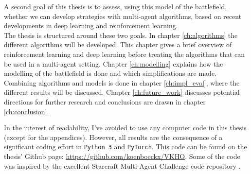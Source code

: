 A second goal of this thesis is to assess, using this model of the battlefield, whether we can develop strategies with multi-agent algorithms, based on recent developments in deep learning and reinforcement learning.\\
The thesis is structured around these two goals. In chapter \ref{ch:algorithms} the different algorithms will be developed. This chapter gives a brief overview of reinforcement learning and deep learning before treating the algorithms that can be used in a multi-agent setting. Chapter \ref{ch:modelling} explains how the modelling of the battlefield is done and which simplifications are made. Combining algorithms and models is done in chapter \ref{ch:impl_eval}, where the different results will be discussed. Chapter \ref{ch:future_work} discusses potential directions for further research and conclusions are drawn in chapter \ref{ch:conclusion}.

In the interest of readability, I've avoided to use any computer code in this thesis (except for the appendices). However, all results are the consequence of a significant coding effort in {\tt Python 3} and {\tt PyTorch}. This code can be found on the thesis' Github page: \url{https://github.com/koenboeckx/VKHO}. Some of the code was inspired by the excellent Starcraft Multi-Agent Challenge code repository \cite{samvelyan19smac}.

%
%
%
